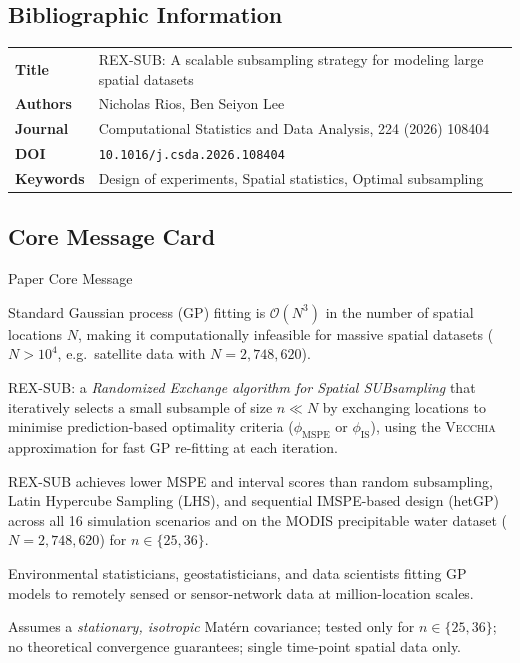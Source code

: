 \documentclass[12pt, a4paper]{article}
\newcommand{\mspe}{$\phi_{\text{MSPE}}$}
\newcommand{\IS}{$\phi_{\text{IS}}$}
\newcommand{\Vecchia}{\textsc{Vecchia}}
\begin{document}
\subsection{Bibliographic Information}

\begin{tabular}{@{}ll@{}}
  \toprule
  \textbf{Title}   & REX-SUB: A scalable subsampling strategy for modeling large spatial datasets \\
  \textbf{Authors} & Nicholas Rios, Ben Seiyon Lee \\
  \textbf{Journal} & Computational Statistics and Data Analysis, 224 (2026) 108404 \\
  \textbf{DOI}     & \texttt{10.1016/j.csda.2026.108404} \\
  \textbf{Keywords}& Design of experiments, Spatial statistics, Optimal subsampling \\
  \bottomrule
\end{tabular}

\subsection{Core Message Card}

\begin{gapbox}{Paper Core Message}
\begin{description}[leftmargin=3em, labelwidth=2.5em]
  \item[\textbf{Problem}]
    Standard Gaussian process (GP) fitting is $\mathcal{O}(N^3)$ in the number of
    spatial locations $N$, making it computationally infeasible for massive spatial
    datasets ($N > 10^4$, e.g.\ satellite data with $N = 2{,}748{,}620$).

  \item[\textbf{Approach}]
    REX-SUB: a \emph{Randomized Exchange algorithm for Spatial SUBsampling} that
    iteratively selects a small subsample of size $n \ll N$ by exchanging locations
    to minimise prediction-based optimality criteria
    (\mspe{} or \IS{}), using the \Vecchia{} approximation for fast GP
    re-fitting at each iteration.

  \item[\textbf{Key result}]
    REX-SUB achieves lower MSPE and interval scores than random subsampling, Latin
    Hypercube Sampling (LHS), and sequential IMSPE-based design (hetGP) across all
    16 simulation scenarios and on the MODIS precipitable water dataset
    ($N = 2{,}748{,}620$) for $n \in \{25, 36\}$.

  \item[\textbf{Who benefits}]
    Environmental statisticians, geostatisticians, and data scientists fitting GP
    models to remotely sensed or sensor-network data at million-location scales.

  \item[\textbf{Important caveat}]
    Assumes a \emph{stationary, isotropic} Matérn covariance; tested only for
    $n \in \{25, 36\}$; no theoretical convergence guarantees; single time-point
    spatial data only.
\end{description}
\end{gapbox}
\end{document}
